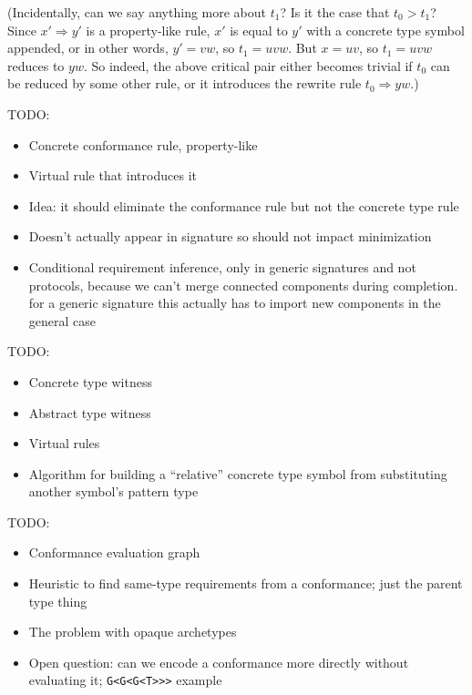 \documentclass[../generics]{subfiles}
\begin{document}
(Incidentally, can we say anything more about $t_1$? Is it the case that $t_0>t_1$? Since $x'\Rightarrow y'$ is a property-like rule, $x'$ is equal to $y'$ with a concrete type symbol appended, or in other words, $y'=vw$, so $t_1=uvw$. But $x=uv$, so $t_1=uvw$ reduces to $yw$. So indeed, the above critical pair either becomes trivial if $t_0$ can be reduced by some other rule, or it introduces the rewrite rule $t_0\Rightarrow yw$.)

TODO:
\begin{itemize}
\item Concrete conformance rule, property-like
\item Virtual rule that introduces it
\item Idea: it should eliminate the conformance rule but not the concrete type rule
\item Doesn't actually appear in signature so should not impact minimization
\item Conditional requirement inference, only in generic signatures and not protocols, because we can't merge connected components during completion. for a generic signature this actually has to import new components in the general case
\end{itemize}


TODO:
\begin{itemize}
\item Concrete type witness
\item Abstract type witness
\item Virtual rules
\item Algorithm for building a ``relative'' concrete type symbol from substituting another symbol's pattern type
\end{itemize}

TODO:
\begin{itemize}
\item Conformance evaluation graph
\item Heuristic to find same-type requirements from a conformance; just the parent type thing
\item The problem with opaque archetypes
\item Open question: can we encode a conformance more directly without evaluating it; \verb|G<G<G<T>>>| example
\end{itemize}

\end{document}
